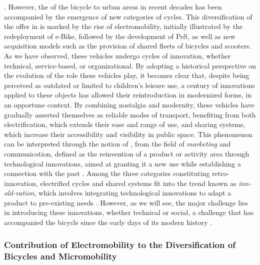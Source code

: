 \begin{refsegment}
{}. However, the  of the bicycle to urban areas in recent decades has been accompanied by the emergence of new categories of cycles. This diversification of the offer in  \textcolor{blue}{\autocite[91-92]{vincent-geslin__2012}} is marked by the rise of electromobility, initially illustrated by the redeployment of \acrshort{e-Bike}, followed by the development of \acrshort{PeS}, as well as new acquisition models such as the provision of shared fleets of bicycles and scooters. As we have observed, these vehicles undergo cycles of innovation, whether technical, service-based, or organizational. By adopting a historical perspective on the evolution of the role these vehicles play, it becomes clear that, despite being perceived as outdated or limited to children's leisure use, a century of innovations applied to these objects has allowed their reintroduction in modernized forms, in an opportune context. By combining nostalgia and modernity, these vehicles have gradually asserted themselves as reliable modes of transport, benefiting from both electrification, which extends their ease and range of use, and sharing systems, which increase their accessibility and visibility in public space. This phenomenon can be interpreted through the notion of , from the field of \textsl{marketing} and communication, defined as the reinvention of a product or activity area through technological innovations, aimed at granting it a new use while establishing a connection with the past \textcolor{blue}{\autocite{barthelot_retro-innovation_2018}}. Among the three categories constituting retro-innovation, electrified cycles and shared systems fit into the trend known as \textsl{inn-old-vation}, which involves integrating technological innovations to adapt a product to pre-existing needs \textcolor{blue}{\autocite{lamy_retro-innovation_2016}}. However, as we will see, the major challenge lies in introducing these innovations, whether technical or social, a challenge that has accompanied the bicycle since the early days of its modern history \textcolor{blue}{\autocite[33]{jouenne_quest-ce_2022}}.%

\subsubsection*{Contribution of Electromobility to the Diversification of Bicycles and Micromobility
    \label{chap1:velo-micromobilite-innovations-electromobilite}
    }


\end{refsegment}
